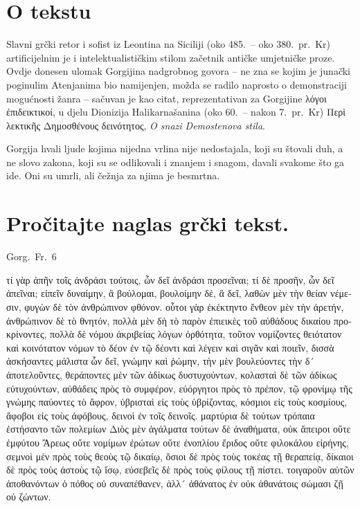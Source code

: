
\section*{O tekstu}

Slavni grčki retor i sofist iz Leontina na Siciliji (oko 485.\ – oko 380.\ pr.~Kr) artificijelnim je i intelektualističkim stilom začetnik antičke umjetničke proze. Ovdje donesen ulomak Gorgijina nadgrobnog govora – ne zna se kojim je junački poginulim Atenjanima bio namijenjen, možda se radilo naprosto o demonstraciji mogućnosti žanra – sačuvan je kao citat, reprezentativan za Gorgijine \textgreek{λόγοι ἐπιδεικτικοί,} u djelu Dionizija Halikarnašanina (oko 60.\ – nakon 7.\ pr.~Kr) \textgreek{Περὶ λεκτικῆς Δημοσθένους δεινότητος,} \textit{O snazi Demostenova stila}.

Gorgija hvali ljude kojima nijedna vrlina nije nedostajala, koji su štovali duh, a ne slovo zakona, koji su se odlikovali i znanjem i snagom, davali svakome što ga ide. Oni su umrli, ali čežnja za njima je besmrtna.



\section*{Pročitajte naglas grčki tekst.}

Gorg.\ Fr.\ 6


\medskip


{\large

\begin{greek}

\noindent τί γὰρ ἀπῆν τοῖς ἀνδράσι τούτοις, ὧν δεῖ ἀνδράσι προσεῖναι; τί δὲ προσῆν, ὧν δεῖ ἀπεῖναι; εἰπεῖν δυναίμην, ἃ βούλομαι, βουλοίμην δέ, ἃ δεῖ, λαθὼν μὲν τὴν θείαν νέμεσιν, φυγὼν δὲ τὸν ἀνθρώπινον φθόνον. οὗτοι γὰρ ἐκέκτηντο ἔνθεον μὲν τὴν ἀρετήν, ἀνθρώπινον δὲ τὸ θνητόν, πολλὰ μὲν δὴ τὸ παρὸν ἐπιεικὲς τοῦ αὐθάδους δικαίου προκρίνοντες, πολλὰ δὲ νόμου ἀκριβείας λόγων ὀρθότητα, τοῦτον νομίζοντες θειότατον καὶ κοινότατον νόμων τὸ δέον ἐν τῷ δέοντι καὶ λέγειν καὶ σιγᾶν καὶ ποιεῖν, δισσὰ ἀσκήσαντες μάλιστα ὧν δεῖ, γνώμην καὶ ῥώμην, τὴν μὲν βουλεύοντες τὴν δ´ ἀποτελοῦντες, θεράποντες μὲν τῶν ἀδίκως δυστυχούντων, κολασταὶ δὲ τῶν ἀδίκως εὐτυχούντων, αὐθάδεις πρὸς τὸ συμφέρον, εὐόργητοι πρὸς τὸ πρέπον, τῷ φρονίμῳ τῆς γνώμης παύοντες τὸ ἄφρον, ὑβρισταὶ εἰς τοὺς ὑβρίζοντας, κόσμιοι εἰς τοὺς κοσμίους, ἄφοβοι εἰς τοὺς ἀφόβους, δεινοὶ ἐν τοῖς δεινοῖς. μαρτύρια δὲ τούτων τρόπαια ἐστήσαντο τῶν πολεμίων Διὸς μὲν ἀγάλματα τούτων δὲ ἀναθήματα, οὐκ ἄπειροι οὔτε ἐμφύτου Ἄρεως οὔτε νομίμων ἐρώτων οὔτε ἐνοπλίου ἔριδος οὔτε φιλοκάλου εἰρήνης, σεμνοὶ μὲν πρὸς τοὺς θεοὺς τῷ δικαίῳ, ὅσιοι δὲ πρὸς τοὺς τοκέας τῇ θεραπείᾳ, δίκαιοι δὲ πρὸς τοὺς ἀστοὺς τῷ ἴσῳ, εὐσεβεῖς δὲ πρὸς τοὺς φίλους τῇ πίστει. τοιγαροῦν αὐτῶν ἀποθανόντων ὁ πόθος οὐ συναπέθανεν, ἀλλ´ ἀθάνατος ἐν οὐκ ἀθανάτοις σώμασι ζῇ οὐ ζώντων.

\end{greek}

}


